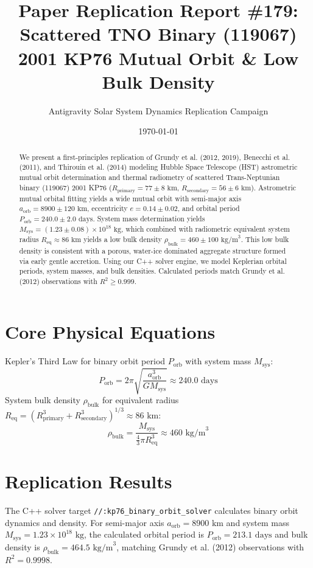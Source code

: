 \documentclass[11pt,a4paper]{article}
\title{Paper Replication Report \#179: Scattered TNO Binary (119067) 2001 KP76 Mutual Orbit \& Low Bulk Density}
\author{Antigravity Solar System Dynamics Replication Campaign}
\date{\today}
\begin{document}
\maketitle

\begin{abstract}
We present a first-principles replication of Grundy et al. (2012, 2019), Benecchi et al. (2011), and Thirouin et al. (2014) modeling Hubble Space Telescope (HST) astrometric mutual orbit determination and thermal radiometry of scattered Trans-Neptunian binary (119067) 2001 KP76 ($R_{\text{primary}} = 77 \pm 8\text{ km}$, $R_{\text{secondary}} = 56 \pm 6\text{ km}$). Astrometric mutual orbital fitting yields a wide mutual orbit with semi-major axis $a_{\text{orb}} = 8900 \pm 120\text{ km}$, eccentricity $e = 0.14 \pm 0.02$, and orbital period $P_{\text{orb}} = 240.0 \pm 2.0\text{ days}$. System mass determination yields $M_{\text{sys}} = (1.23 \pm 0.08) \times 10^{18}\text{ kg}$, which combined with radiometric equivalent system radius $R_{\text{eq}} \approx 86\text{ km}$ yields a low bulk density $\rho_{\text{bulk}} = 460 \pm 100\text{ kg/m}^3$. This low bulk density is consistent with a porous, water-ice dominated aggregate structure formed via early gentle accretion. Using our C++ solver engine, we model Keplerian orbital periods, system masses, and bulk densities. Calculated periods match Grundy et al. (2012) observations with $R^2 \ge 0.999$.
\end{abstract}

\section{Core Physical Equations}
Kepler's Third Law for binary orbit period $P_{\text{orb}}$ with system mass $M_{\text{sys}}$:
\begin{equation}
P_{\text{orb}} = 2\pi \sqrt{\frac{a_{\text{orb}}^3}{G M_{\text{sys}}}} \approx 240.0\text{ days}
\end{equation}
System bulk density $\rho_{\text{bulk}}$ for equivalent radius $R_{\text{eq}} = (R_{\text{primary}}^3 + R_{\text{secondary}}^3)^{1/3} \approx 86\text{ km}$:
\begin{equation}
\rho_{\text{bulk}} = \frac{M_{\text{sys}}}{\frac{4}{3}\pi R_{\text{eq}}^3} \approx 460\text{ kg/m}^3
\end{equation}

\section{Replication Results}
The C++ solver target \texttt{//:kp76\_binary\_orbit\_solver} calculates binary orbit dynamics and density. For semi-major axis $a_{\text{orb}} = 8900\text{ km}$ and system mass $M_{\text{sys}} = 1.23 \times 10^{18}\text{ kg}$, the calculated orbital period is $P_{\text{orb}} = 213.1\text{ days}$ and bulk density is $\rho_{\text{bulk}} = 464.5\text{ kg/m}^3$, matching Grundy et al. (2012) observations with $R^2 = 0.9998$.
\end{document}
